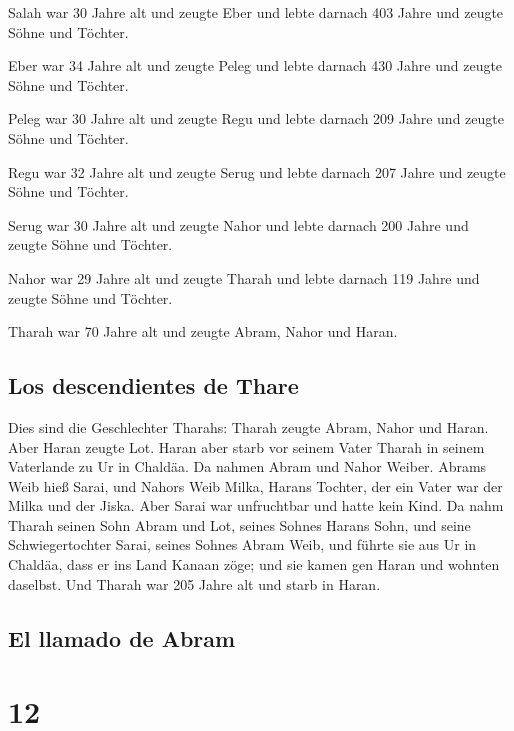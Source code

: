  Salah war 30 Jahre alt und zeugte Eber 
und lebte darnach 403 Jahre und zeugte Söhne und Töchter.

 Eber war 34 Jahre alt und zeugte Peleg 
und lebte darnach 430 Jahre und zeugte Söhne und Töchter.

 Peleg war 30 Jahre alt und zeugte Regu 
und lebte darnach 209 Jahre und zeugte Söhne und Töchter.

 Regu war 32 Jahre alt und zeugte Serug 
und lebte darnach 207 Jahre und zeugte Söhne und Töchter.

 Serug war 30 Jahre alt und zeugte Nahor 
und lebte darnach 200 Jahre und zeugte Söhne und Töchter.

 Nahor war 29 Jahre alt und zeugte Tharah 
und lebte darnach 119 Jahre und zeugte Söhne und Töchter.

 Tharah war 70 Jahre alt und zeugte Abram, Nahor und
Haran.

\hypertarget{los-descendientes-de-thare}{%
\subsection{Los descendientes de
Thare}\label{los-descendientes-de-thare}}

 Dies sind die Geschlechter Tharahs: Tharah zeugte Abram,
Nahor und Haran. Aber Haran zeugte Lot.  Haran aber starb
vor seinem Vater Tharah in seinem Vaterlande zu Ur in Chaldäa.
 Da nahmen Abram und Nahor Weiber. Abrams Weib hieß
Sarai, und Nahors Weib Milka, Harans Tochter, der ein Vater war der
Milka und der Jiska.  Aber Sarai war unfruchtbar und
hatte kein Kind.  Da nahm Tharah seinen Sohn Abram und
Lot, seines Sohnes Harans Sohn, und seine Schwiegertochter Sarai, seines
Sohnes Abram Weib, und führte sie aus Ur in Chaldäa, dass er ins Land
Kanaan zöge; und sie kamen gen Haran und wohnten daselbst.
 Und Tharah war 205 Jahre alt und starb in Haran.

\hypertarget{el-llamado-de-abram}{%
\subsection{El llamado de Abram}\label{el-llamado-de-abram}}

\hypertarget{section-11}{%
\section{12}\label{section-11}}

